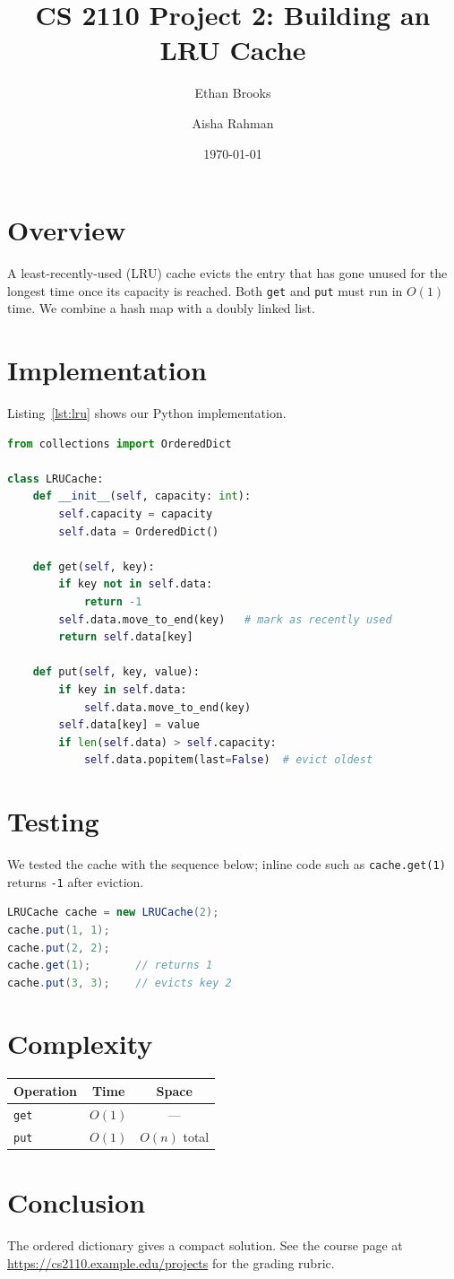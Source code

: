 \documentclass[11pt]{article}
\title{CS 2110 Project 2: Building an LRU Cache}
\author{Ethan Brooks \and Aisha Rahman}
\date{\today}
\begin{document}
\maketitle

\section{Overview}
A least-recently-used (LRU) cache evicts the entry that has gone unused for the longest
time once its capacity is reached. Both \texttt{get} and \texttt{put} must run in $O(1)$
time. We combine a hash map with a doubly linked list.

\section{Implementation}
Listing~\ref{lst:lru} shows our Python implementation.

\begin{lstlisting}[language=Python, caption={LRU cache with an ordered dictionary.}, label={lst:lru}]
from collections import OrderedDict

class LRUCache:
    def __init__(self, capacity: int):
        self.capacity = capacity
        self.data = OrderedDict()

    def get(self, key):
        if key not in self.data:
            return -1
        self.data.move_to_end(key)   # mark as recently used
        return self.data[key]

    def put(self, key, value):
        if key in self.data:
            self.data.move_to_end(key)
        self.data[key] = value
        if len(self.data) > self.capacity:
            self.data.popitem(last=False)  # evict oldest
\end{lstlisting}

\section{Testing}
We tested the cache with the sequence below; inline code such as
\lstinline{cache.get(1)} returns \lstinline{-1} after eviction.

\begin{lstlisting}[language=Java, numbers=none]
LRUCache cache = new LRUCache(2);
cache.put(1, 1);
cache.put(2, 2);
cache.get(1);       // returns 1
cache.put(3, 3);    // evicts key 2
\end{lstlisting}

\section{Complexity}
\begin{tabular}{|l|c|c|}
\hline
Operation & Time & Space \\
\hline
\texttt{get} & $O(1)$ & --- \\
\texttt{put} & $O(1)$ & $O(n)$ total \\
\hline
\end{tabular}

\section{Conclusion}
The ordered dictionary gives a compact solution. See the course page at
\url{https://cs2110.example.edu/projects} for the grading rubric.
\end{document}
